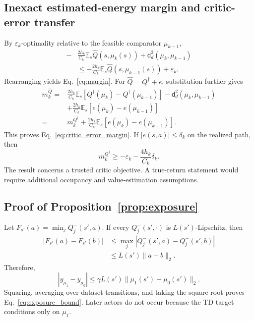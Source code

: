 \documentclass[twoside]{article}
\begin{document}
\subsection{Inexact estimated-energy margin and critic-error transfer}
By $\varepsilon_k$-optimality relative to the feasible comparator
$\mu_{k-1}$,
\begin{equation}
\begin{split}
-&\frac{2h_k}{C_k}\mathbb E_s\widehat Q(s,\mu_k(s))
+\mathsf d_d^2(\mu_k,\mu_{k-1})\\
&\leq
-\frac{2h_k}{C_k}\mathbb E_s\widehat Q(s,\mu_{k-1}(s))
+\varepsilon_k.
\end{split}
\end{equation}
Rearranging yields Eq.~\eqref{eq:margin}. For $\widehat Q=Q^\dagger+e$,
substitution further gives
\begin{equation}
\begin{split}
m_k^{\widehat Q}
={}&\frac{2h_k}{C_k}\mathbb E_s
 [Q^\dagger(\mu_k)-Q^\dagger(\mu_{k-1})]
 -\mathsf d_d^2(\mu_k,\mu_{k-1})\\
&+\frac{2h_k}{C_k}\mathbb E_s[e(\mu_k)-e(\mu_{k-1})]\\
={}&m_k^{Q^\dagger}
+\frac{2h_k}{C_k}\mathbb E_s[e(\mu_k)-e(\mu_{k-1})].
\end{split}
\end{equation}
This proves Eq.~\eqref{eq:critic_error_margin}. If
$|e(s,a)|\leq\delta_k$ on the realized path, then
\begin{equation}
m_k^{Q^\dagger}\geq-\varepsilon_k-\frac{4h_k}{C_k}\delta_k.
\end{equation}
The result concerns a trusted critic objective. A true-return statement would
require additional occupancy and value-estimation assumptions.

\subsection{Proof of Proposition~\ref{prop:exposure}}
Let $F_{s'}(a)=\min_jQ_j^-(s',a)$. If every
$Q_j^-(s',\cdot)$ is $L(s')$-Lipschitz, then
\begin{equation}
\begin{split}
|F_{s'}(a)-F_{s'}(b)|
&\leq\max_j|Q_j^-(s',a)-Q_j^-(s',b)|\\
&\leq L(s')\|a-b\|_2.
\end{split}
\end{equation}
Therefore,
\begin{equation}
|y_{\mu_1}-y_{\mu_0}|
\leq\gamma L(s')\|\mu_1(s')-\mu_0(s')\|_2.
\end{equation}
Squaring, averaging over dataset transitions, and taking the square root proves
Eq.~\eqref{eq:exposure_bound}. Later actors do not occur because the TD target
conditions only on $\mu_1$.
\end{document}
